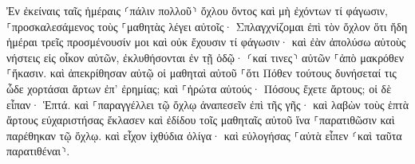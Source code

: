 \documentclass{openreader}
\begin{document}
Ἐν ἐκείναις ταῖς ἡμέραις ⸂πάλιν πολλοῦ⸃ ὄχλου ὄντος καὶ μὴ ἐχόντων τί φάγωσιν, ⸀προσκαλεσάμενος τοὺς ⸀μαθητὰς λέγει αὐτοῖς· 
Σπλαγχνίζομαι ἐπὶ τὸν ὄχλον ὅτι ἤδη ἡμέραι τρεῖς προσμένουσίν μοι καὶ οὐκ ἔχουσιν τί φάγωσιν· 
καὶ ἐὰν ἀπολύσω αὐτοὺς νήστεις εἰς οἶκον αὐτῶν, ἐκλυθήσονται ἐν τῇ ὁδῷ· ⸂καί τινες⸃ αὐτῶν ⸀ἀπὸ μακρόθεν ⸀ἥκασιν. 
καὶ ἀπεκρίθησαν αὐτῷ οἱ μαθηταὶ αὐτοῦ ⸀ὅτι Πόθεν τούτους δυνήσεταί τις ὧδε χορτάσαι ἄρτων ἐπ’ ἐρημίας; 
καὶ ⸀ἠρώτα αὐτούς· Πόσους ἔχετε ἄρτους; οἱ δὲ εἶπαν· Ἑπτά. 
καὶ ⸀παραγγέλλει τῷ ὄχλῳ ἀναπεσεῖν ἐπὶ τῆς γῆς· καὶ λαβὼν τοὺς ἑπτὰ ἄρτους εὐχαριστήσας ἔκλασεν καὶ ἐδίδου τοῖς μαθηταῖς αὐτοῦ ἵνα ⸀παρατιθῶσιν καὶ παρέθηκαν τῷ ὄχλῳ. 
καὶ εἶχον ἰχθύδια ὀλίγα· καὶ εὐλογήσας ⸀αὐτὰ εἶπεν ⸂καὶ ταῦτα παρατιθέναι⸃. 
\end{document}
